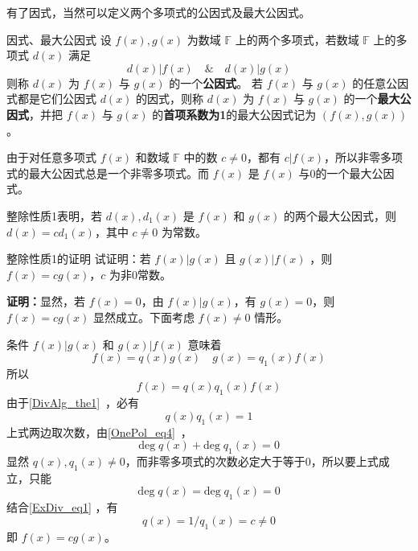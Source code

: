 有了因式，当然可以定义两个多项式的公因式及最大公因式。
\begin{definition}{因式、最大公因式}\label{ExDiv_def2}
设 $f(x),g(x)$ 为数域 $\mathbb{F}$ 上的两个多项式，若数域 $\mathbb{F}$ 上的多项式 $d(x)$ 满足
\begin{equation}
d(x)|f(x)\quad\&\quad d(x)|g(x)
\end{equation}
则称 $d(x)$ 为 $f(x)$ 与 $g(x)$ 的一个\textbf{公因式}。
若 $f(x)$ 与 $g(x)$ 的任意公因式都是它们公因式 $d(x)$ 的因式，则称 $d(x)$ 为 $f(x)$ 与 $g(x)$ 的一个\textbf{最大公因式}，并把 $f(x)$ 与 $g(x)$ 的\textbf{首项系数为1}的最大公因式记为 $(f(x),g(x))$。
\end{definition}

由于对任意多项式 $f(x)$ 和数域 $\mathbb{F}$ 中的数 $c\neq 0$，都有 $c|f(x)$，所以非零多项式的最大公因式总是一个非零多项式。而 $f(x)$ 是 $f(x)$ 与0的一个最大公因式。

整除性质1表明，若 $d(x),d_1(x)$ 是 $f(x)$ 和 $g(x)$ 的两个最大公因式，则 $d(x)=cd_1(x)$，其中 $c\neq 0$ 为常数。
\begin{example}{整除性质1的证明}\label{ExDiv_ex1}
试证明：若 $f(x)|g(x)$ 且 $g(x)|f(x)$ ，则 $f(x)=cg(x)$，$c$ 为非0常数。

\textbf{证明：}显然，若 $f(x)=0$，由 $f(x)|g(x)$，有 $g(x)=0$，则 $f(x)=cg(x)$ 显然成立。下面考虑 $f(x)\neq 0$ 情形。

条件 $f(x)|g(x)$ 和 $g(x)|f(x)$ 意味着
\begin{equation}
f(x)=q(x)g(x)\quad g(x)=q_1(x)f(x)
\end{equation}
所以
\begin{equation}
f(x)=q(x)q_1(x)f(x)
\end{equation}
由于\autoref{DivAlg_the1}~，必有
\begin{equation}\label{ExDiv_eq1}
q(x)q_1(x)=1
\end{equation}
上式两边取次数，由\autoref{OnePol_eq4}~，
\begin{equation}
\mathrm{deg}\;q(x)+\mathrm{deg}\;q_1(x)=0
\end{equation}
显然 $q(x),q_1(x)\neq 0$，而非零多项式的次数必定大于等于0，所以要上式成立，只能
\begin{equation}
\mathrm{deg}\;q(x)=\mathrm{deg}\;q_1(x)=0
\end{equation}
结合\autoref{ExDiv_eq1} ，有
 \begin{equation}
 q(x)=1/q_1(x)=c\neq 0
 \end{equation}
 即 $f(x)=cg(x)$。

\end{example}

